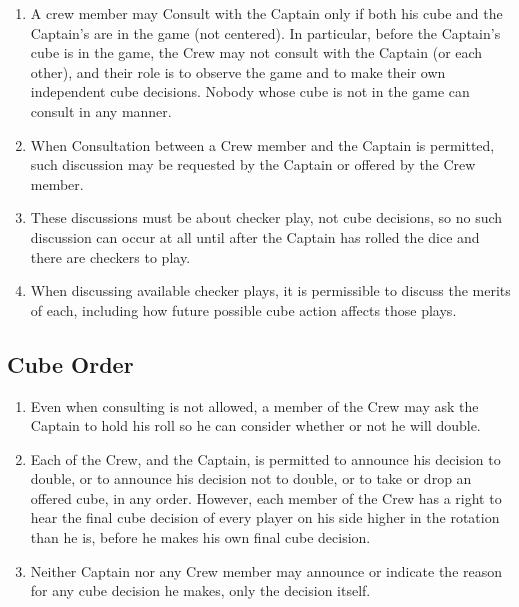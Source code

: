 \documentclass[11pt]{article}
\begin{document}
\begin{enumerate}
\item A crew member may Consult with the Captain only if both his cube
  and the Captain's are in the game (not centered).  In particular,
  before the Captain's cube is in the game, the Crew may not consult
  with the Captain (or each other), and their role is to observe the
  game and to make their own independent cube decisions.  Nobody whose
  cube is not in the game can consult in any manner.

\item When Consultation between a Crew member and the Captain is
  permitted, such discussion may be requested by the Captain or
  offered by the Crew member.

\item
  These discussions must be about checker play, not cube decisions, so
  no such discussion can occur at all until after the Captain has rolled
  the dice and there are checkers to play.

\item When discussing available checker plays, it is permissible to
  discuss the merits of each, including how future possible cube
  action affects those plays.

\end{enumerate}

\subsection*{Cube Order}

\begin{enumerate}
\item Even when consulting is not allowed, a member of the Crew may
  ask the Captain to hold his roll so he can consider whether or not
  he will double.

\item Each of the Crew, and the Captain, is permitted to announce his
  decision to double, or to announce his decision not to double, or to
  take or drop an offered cube, in any order.  However, each member of
  the Crew has a right to hear the final cube decision of every player
  on his side higher in the rotation than he is, before he makes his
  own final cube decision.

\item Neither Captain nor any Crew member may announce or indicate the
  reason for any cube decision he makes, only the decision itself.
\end{enumerate}
\end{document}
